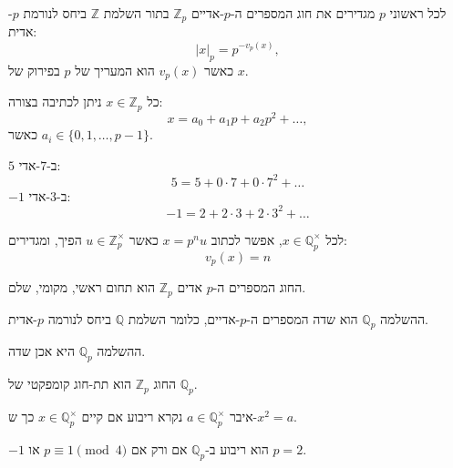 \documentclass{tstextbook}
\begin{document}
\begin{definition}
לכל ראשוני \(p\) מגדירים את חוג המספרים ה-\(p\)-אדיים \(\mathbb{Z}_p\) בתור השלמת \(\mathbb{Z}\) ביחס לנורמת \(p\)-אדית:
$$|x|_p = p^{-v_p(x)},$$
כאשר \(v_p(x)\) הוא המעריך של \(p\) בפירוק של \(x\).

\end{definition}
\begin{proposition}
כל \(x \in \mathbb{Z}_p\) ניתן לכתיבה בצורה:
$$x = a_0 + a_1 p + a_2 p^2 + \dots,$$
כאשר \(a_i \in \{0,1,\dots,p-1\}\).

\end{proposition}
\begin{example}
\(5\) ב-\(7\)-אדי: 
$$5 = 5 + 0\cdot 7 + 0\cdot 7^2 + \dots$$\(-1\) ב-\(3\)-אדי: 
$$-1 = 2 + 2\cdot 3 + 2\cdot 3^2 + \dots$$

\end{example}
\begin{definition}[ולואציה]
לכל \(x \in \mathbb{Q}_p^{\times}\), אפשר לכתוב \(x = p^n u\) כאשר \(u \in \mathbb{Z}_p^{\times}\) הפיך, ומגדירים:
$$v_p(x) = n$$

\end{definition}
\begin{proposition}
החוג המספרים ה-\(p\) אדים \(\mathbb{Z}_p\) הוא תחום ראשי, מקומי, שלם.

\end{proposition}
\begin{definition}
ההשלמה \(\mathbb{Q}_p\) הוא שדה המספרים ה-\(p\)-אדיים, כלומר השלמת \(\mathbb{Q}\) ביחס לנורמה \(p\)-אדית.

\end{definition}
\begin{proposition}
ההשלמה \(\mathbb{Q}_{p}\) היא אכן שדה.

\end{proposition}
\begin{proposition}
החוג \(\mathbb{Z}_p\) הוא תת-חוג קומפקטי של \(\mathbb{Q}_p\).

\end{proposition}
\begin{definition}
איבר \(a \in \mathbb{Q}_p^{\times}\) נקרא ריבוע אם קיים \(x \in \mathbb{Q}_p^{\times}\) כך ש-\(x^2 = a\).

\end{definition}
\begin{proposition}
\(-1\) הוא ריבוע ב-\(\mathbb{Q}_p\) אם ורק אם \(p \equiv 1 \pmod{4}\) או \(p=2\).

\end{proposition}
\end{document}

